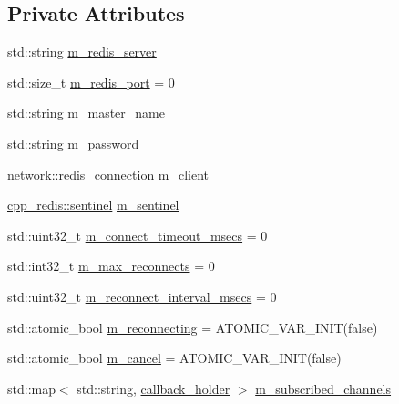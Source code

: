 \subsection*{Private Attributes}
\begin{DoxyCompactItemize}
\item 
std\+::string \hyperlink{classcpp__redis_1_1subscriber_ab3001cb0e748940490039b59efc5be7d}{m\+\_\+redis\+\_\+server}
\item 
std\+::size\+\_\+t \hyperlink{classcpp__redis_1_1subscriber_a606e99982af301b722cc1ebe8c1889bc}{m\+\_\+redis\+\_\+port} = 0
\item 
std\+::string \hyperlink{classcpp__redis_1_1subscriber_a79e64728d9f6094fdd5c24418b889f19}{m\+\_\+master\+\_\+name}
\item 
std\+::string \hyperlink{classcpp__redis_1_1subscriber_a05f90439d1da469a1184651eea89c015}{m\+\_\+password}
\item 
\hyperlink{classcpp__redis_1_1network_1_1redis__connection}{network\+::redis\+\_\+connection} \hyperlink{classcpp__redis_1_1subscriber_ac982bd5661f59b8e2021dbdb80615e38}{m\+\_\+client}
\item 
\hyperlink{classcpp__redis_1_1sentinel}{cpp\+\_\+redis\+::sentinel} \hyperlink{classcpp__redis_1_1subscriber_a74ea9dc2c41fa4bc3b19f6ae2a3c2513}{m\+\_\+sentinel}
\item 
std\+::uint32\+\_\+t \hyperlink{classcpp__redis_1_1subscriber_a2fd648e01a4b88d63b6b977e0b694fa5}{m\+\_\+connect\+\_\+timeout\+\_\+msecs} = 0
\item 
std\+::int32\+\_\+t \hyperlink{classcpp__redis_1_1subscriber_a8c22f20f5a196eb72233d203b102bf3c}{m\+\_\+max\+\_\+reconnects} = 0
\item 
std\+::uint32\+\_\+t \hyperlink{classcpp__redis_1_1subscriber_a61fb1560948d3ddaff3b322c30e7a8a7}{m\+\_\+reconnect\+\_\+interval\+\_\+msecs} = 0
\item 
std\+::atomic\+\_\+bool \hyperlink{classcpp__redis_1_1subscriber_a71517f71ac616e52b48e371be291665b}{m\+\_\+reconnecting} = A\+T\+O\+M\+I\+C\+\_\+\+V\+A\+R\+\_\+\+I\+N\+IT(false)
\item 
std\+::atomic\+\_\+bool \hyperlink{classcpp__redis_1_1subscriber_a66dd15a4eb08cf3ed7e926a83b10cc9f}{m\+\_\+cancel} = A\+T\+O\+M\+I\+C\+\_\+\+V\+A\+R\+\_\+\+I\+N\+IT(false)
\item 
std\+::map$<$ std\+::string, \hyperlink{structcpp__redis_1_1subscriber_1_1callback__holder}{callback\+\_\+holder} $>$ \hyperlink{classcpp__redis_1_1subscriber_aa0e98504b640b44f23577ed2f8e30f74}{m\+\_\+subscribed\+\_\+channels}

\end{DoxyCompactItemize}
